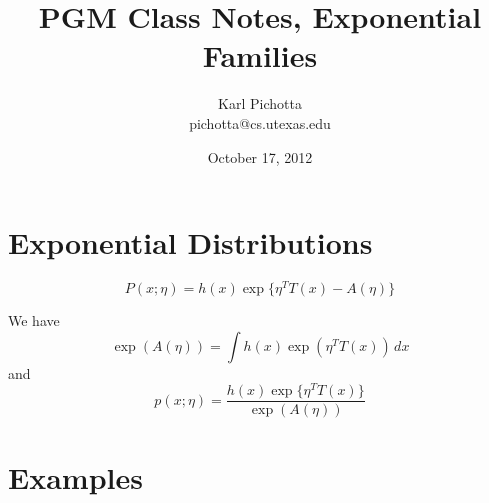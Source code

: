 \documentclass{article}
\title{PGM Class Notes, Exponential Families}
\author{Karl Pichotta \\ pichotta@cs.utexas.edu}
\date{October 17, 2012}
\begin{document}
\maketitle




\section{Exponential Distributions}

$$
P(x;\eta) = h(x) \exp\{ \eta^TT(x) - A(\eta) \}
$$

We have
$$
\exp(A(\eta))
=
\int
h(x) 
\exp(\eta^TT(x))
\, dx
$$
and
$$
p(x;\eta)
=
\frac{h(x) \exp\{ \eta^T T(x)\}}
{\exp(A(\eta))}
$$


\section{Examples}
\end{document}
